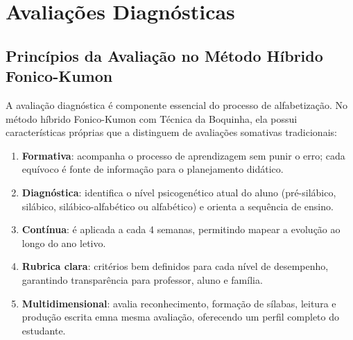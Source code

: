 
\chapter{Avaliações Diagnósticas}

\section{Princípios da Avaliação no Método Híbrido Fonico-Kumon}

A avaliação diagnóstica é componente essencial do processo de alfabetização.
No método híbrido Fonico-Kumon com Técnica da Boquinha, ela possui
características próprias que a distinguem de avaliações somativas tradicionais:

\begin{enumerate}[leftmargin=2cm]
  \item \textbf{Formativa}: acompanha o processo de aprendizagem sem punir o erro;
        cada equívoco é fonte de informação para o planejamento didático.
  \item \textbf{Diagnóstica}: identifica o nível psicogenético atual do aluno
        (pré-silábico, silábico, silábico-alfabético ou alfabético) e orienta
        a sequência de ensino.
  \item \textbf{Contínua}: é aplicada a cada 4 semanas, permitindo mapear a
        evolução ao longo do ano letivo.
  \item \textbf{Rubrica clara}: critérios bem definidos para cada nível de
        desempenho, garantindo transparência para professor, aluno e família.
  \item \textbf{Multidimensional}: avalia reconhecimento, formação de sílabas,
        leitura e produção escrita emna mesma avaliação, oferecendo um perfil
        completo do estudante.
\end{enumerate}

